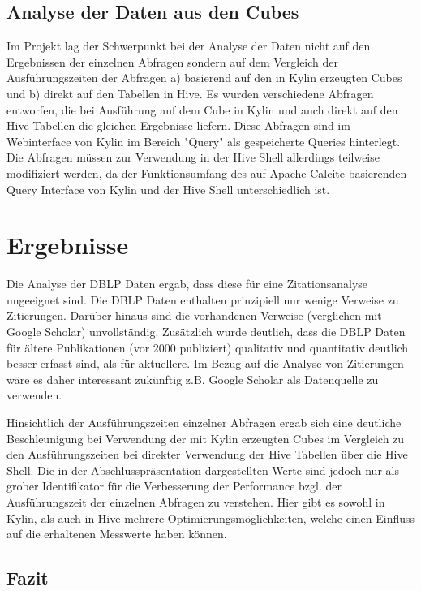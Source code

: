 \documentclass[a4paper,11pt,utf8]{scrartcl}
\begin{document}
\subsection{Analyse der Daten aus den Cubes}

Im Projekt lag der Schwerpunkt bei der Analyse der Daten nicht auf den Ergebnissen der einzelnen Abfragen sondern auf dem Vergleich der Ausführungszeiten der Abfragen a) basierend auf den in Kylin erzeugten Cubes und b) direkt auf den Tabellen in Hive. Es wurden verschiedene Abfragen entworfen, die bei Ausführung auf dem Cube in Kylin und auch direkt auf den Hive Tabellen die gleichen Ergebnisse liefern. Diese Abfragen sind im Webinterface von Kylin im Bereich "Query" als \glqq gespeicherte Queries\grqq{} hinterlegt. Die Abfragen müssen zur Verwendung in der Hive Shell allerdings teilweise modifiziert werden, da der Funktionsumfang des auf Apache Calcite basierenden Query Interface von Kylin und der Hive Shell unterschiedlich ist.

\section{Ergebnisse}
\label{sec:Ergebnisse}

Die Analyse der DBLP Daten ergab, dass diese für eine Zitationsanalyse ungeeignet sind. Die DBLP Daten enthalten prinzipiell nur wenige Verweise zu Zitierungen. Darüber hinaus sind die vorhandenen Verweise (verglichen mit Google Scholar) unvollständig. Zusätzlich wurde deutlich, dass die DBLP Daten für ältere Publikationen (vor 2000 publiziert) qualitativ und quantitativ deutlich besser erfasst sind, als für aktuellere. Im Bezug auf die Analyse von Zitierungen wäre es daher interessant zukünftig z.B. Google Scholar als Datenquelle zu verwenden.\medskip\par

\noindent Hinsichtlich der Ausführungszeiten einzelner Abfragen ergab sich eine deutliche Beschleunigung bei Verwendung der mit Kylin erzeugten Cubes im Vergleich zu den Ausführungszeiten bei direkter Verwendung der Hive Tabellen über die Hive Shell. Die in der Abschlusspräsentation dargestellten Werte sind jedoch nur als grober Identifikator für die Verbesserung der Performance bzgl. der Ausführungszeit der einzelnen Abfragen zu verstehen. Hier gibt es sowohl in Kylin, als auch in Hive mehrere Optimierungsmöglichkeiten, welche einen Einfluss auf die erhaltenen Messwerte haben können.

\subsection{Fazit}
\end{document}
